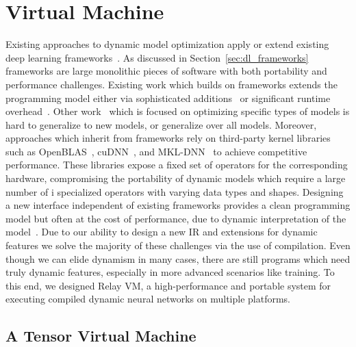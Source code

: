 \section{Virtual Machine}
\label{sec:vm}

Existing approaches to dynamic model optimization apply or extend existing
  deep learning frameworks~\citep{xu2018cavs, gao2018low, yu2018dynamic, jeong2018improving, jeong2019janus, dynet, tf_fold}.
As discussed in Section~\ref{sec:dl_frameworks} frameworks are large monolithic pieces
  of software with both portability and performance challenges.
Existing work which builds on frameworks extends the programming model either
  via sophisticated additions~\citep{yu2018dynamic} or significant
  runtime overhead~\citep{tf_fold, jeong2019janus}.
Other work~\citep{xu2018cavs, gao2018low, tf_fold} which is focused on
  optimizing specific types of models is hard to generalize to new models,
  or generalize over all models.
Moreover, approaches which inherit from frameworks rely on third-party kernel
  libraries such as OpenBLAS~\citep{xianyi2014openblas},
  cuDNN~\citep{cudnn}, and MKL-DNN~\citep{mkldnn} to achieve competitive performance.
These libraries expose a fixed set of operators for the corresponding hardware,
  compromising the portability of dynamic models which require a large number of i
  specialized operators with varying data types and shapes.
Designing a new interface independent of existing frameworks
  provides a clean programming model but often at the cost of performance,
  due to dynamic interpretation of the model~\citep{dynet}.
Due to our ability to design a new IR and extensions for dynamic features
  we solve the majority of these challenges via the use of compilation.
Even though we can elide dynamism in many cases, there are still
  programs which need truly dynamic features, especially in more
  advanced scenarios like training.
To this end, we designed Relay VM, a high-performance and
  portable system for executing compiled dynamic neural networks
  on multiple platforms.

\subsection{A Tensor Virtual Machine}

